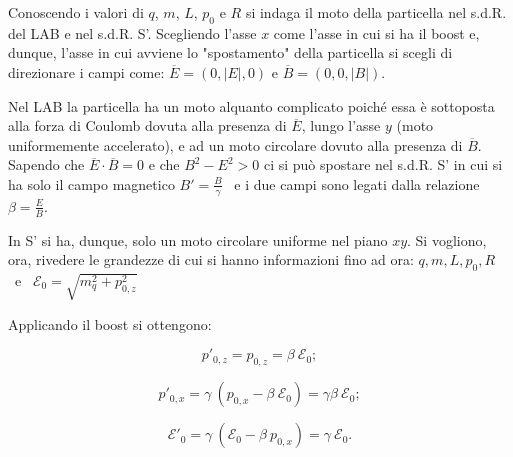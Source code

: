\documentclass[12pt,twoside,a4]{article}
\begin{document}
\begin{solution}
Conoscendo i valori di $q$, $m$, $L$, $p_0$ e $R$ si indaga il moto della particella nel s.d.R. del LAB e nel s.d.R. S'. Scegliendo l'asse $x$ come l'asse in cui si ha il boost e, dunque, l'asse in cui avviene lo "spostamento" della particella si scegli di direzionare i campi come: $\overline{E} = (0,|E|,0)$ e $\overline{B} = (0,0,|B|)$.

Nel LAB la particella ha un moto alquanto complicato poiché essa è sottoposta alla forza di Coulomb dovuta alla presenza di $\overline{E}$, lungo l'asse $y$ (moto uniformemente accelerato), e ad un moto circolare dovuto alla presenza di $\overline{B}$. Sapendo che $\overline{E} \cdot \overline{B} = 0$ e che $B^2-E^2 > 0$ ci si può spostare nel s.d.R. S' in cui si ha solo il campo magnetico $B'= \frac{B}{\gamma}$ \ e i due campi sono legati dalla relazione $\beta = \frac{E}{B}$.

In S' si ha, dunque, solo un moto circolare uniforme nel piano $xy$. 
Si vogliono, ora, rivedere le grandezze di cui si hanno informazioni fino ad ora: 
$q, m, L, p_0, R$ \ e \ $\mathcal{E}_0 = \sqrt{m^2_q + p^2_{0,z}}$

Applicando il boost si ottengono:

\begin{equation*}
    p'_{0,z} = p_{0,z} = \beta \ \mathcal{E}_0;
\end{equation*}

\begin{equation*}
    p'_{0,x} = \gamma  \ (p_{0,x} - \beta \ \mathcal{E}_0) = \gamma  \beta \ \mathcal{E}_0;
\end{equation*}

\begin{equation*}
    \mathcal{E}'_0 = \gamma \ (\mathcal{E}_0 - \beta \ p_{0,x}) = \gamma \ \mathcal{E}_0.
\end{equation*}


\end{solution}
\end{document}
